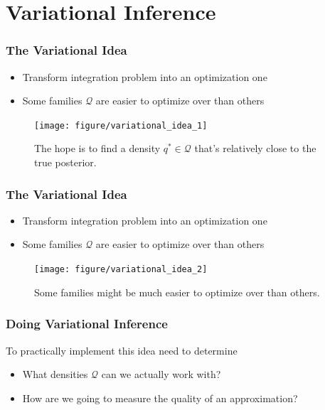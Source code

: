 \documentclass[10pt,mathserif]{beamer}
\begin{document}
\section{Variational Inference}
\label{sec:introduction}

\begin{frame}
  \frametitle{The Variational Idea}
  \begin{itemize}
  \item Transform integration problem into an optimization one
  \item Some families $\mathcal{Q}$ are easier to optimize over than others
  \end{itemize}
\begin{figure}[ht]
  \centering
  \texttt{[image: figure/variational\_idea\_1]}
  \caption{The hope is to find a density $q^{\ast} \in \mathcal{Q}$ that's
    relatively close to the true posterior. \label{fig:variational_idea_1} }
\end{figure}
\end{frame}

\begin{frame}
  \frametitle{The Variational Idea}
  \begin{itemize}
  \item Transform integration problem into an optimization one
  \item Some families $\mathcal{Q}$ are easier to optimize over than others
  \end{itemize}
\begin{figure}[ht]
  \centering
  \texttt{[image: figure/variational\_idea\_2]}
  \caption{Some families might be much easier to optimize over than others.
    \label{fig:variational_idea_1} }
\end{figure}
\end{frame}

\begin{frame}
  \frametitle{Doing Variational Inference}
  To practically implement this idea need to determine
  \begin{itemize}
  \item What densities $\mathcal{Q}$ can we actually work with?
  \item How are we going to measure the quality of an approximation?
  \end{itemize}
\end{frame}
\end{document}
